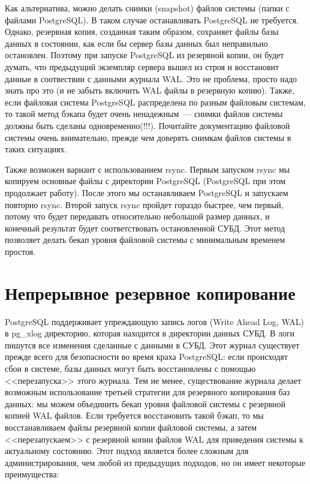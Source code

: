 Как альтернатива, можно делать снимки (snapshot) файлов системы (папки с файлами PostgreSQL). В таком случае останавливать PostgreSQL не требуется. Однако, резервная копия, созданная таким образом, сохраняет файлы базы данных в состоянии, как если бы сервер базы данных был неправильно остановлен. Поэтому при запуске PostgreSQL из резервной копии, он будет думать, что предыдущий экземпляр сервера вышел из строя и восстановит данные в соотвествии с данными журнала WAL. Это не проблема, просто надо знать про это (и не забыть включить WAL файлы в резервную копию). Также, если файловая система PostgreSQL распределена по разным файловым системам, то такой метод бэкапа будет очень ненадежным~--- снимки файлов системы должны быть сделаны одновременно(!!!). Почитайте документацию файловой системы очень внимательно, прежде чем доверять снимкам файлов системы в таких ситуациях.

Также возможен вариант с использованием rsync. Первым запуском rsync мы копируем основные файлы с директории PostgreSQL (PostgreSQL при этом продолжает работу). После этого мы останавливаем PostgreSQL и запускаем повторно rsync. Второй запуск rsync пройдет гораздо быстрее, чем первый, потому что будет передавать относительно небольшой размер данных, и конечный результат будет соответствовать остановленной СУБД. Этот метод позволяет делать бекап уровня файловой системы с минимальным временем простоя.


\section{Непрерывное резервное копирование}

PostgreSQL поддерживает упреждающую запись логов (Write Ahead Log, WAL) в pg\_xlog директорию, которая находится в директории данных СУБД. В логи пишутся все изменения сделанные с данными в СУБД. Этот журнал существует прежде всего для безопасности во время краха PostgreSQL: если происходят сбои в системе, базы данных могут быть восстановлены с помощью <<перезапуска>> этого журнала. Тем не менее, существование журнала делает возможным использование третьей стратегии для резервного копирования баз данных: мы можем объединить бекап уровня файловой системы с резервной копией WAL файлов. Если требуется восстановить такой бэкап, то мы восстанавливаем файлы резервной копии файловой системы, а затем <<перезапускаем>> с резервной копии файлов WAL для приведения системы к актуальному состоянию. Этот подход является более сложным для администрирования, чем любой из предыдущих подходов, но он имеет некоторые преимущества:

